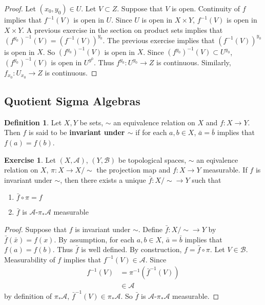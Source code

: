 \documentclass[12pt]{amsart}
\theoremstyle{definition}
\newtheorem{defn}[definition]{Definition}
\newtheorem{ex}[definition]{Exercise}
\newcommand{\MA}{\mathcal{A}}
\newcommand{\MB}{\mathcal{B}}
\newcommand{\lex}[1]{\label{ex:#1}}
\begin{document}
	\begin{proof}
		Let $(x_0, y_0) \in U$. Let $V \subset Z$. Suppose that $V$ is open. Continuity of $f$ implies that $f^{-1}(V)$ is open in $U$. Since $U$ is open in $X \times Y$, $f^{-1}(V)$ is open in $X \times Y$. A previous exercise in the section on product sets implies that $(f^{y_0})^{-1}(V) = (f^{-1}(V))^{y_0}$. The previous exercise implies that $(f^{-1}(V))^{y_0}$ is open in $X$. So $(f^{y_0})^{-1}(V)$ is open in $X$. Since $(f^{y_0})^{-1}(V) \subset U^{y_0}$, $(f^{y_0})^{-1}(V)$ is open in $U^{y^0}$. Thus $f^{y_0}: U^{y_0} \rightarrow Z$ is continuous. Similarly, $f_{x_0}: U_{x_0} \rightarrow Z$ is continuous.
	\end{proof}


	
	
	
	
	
	
	
	
	
	
	
	
	
	
	
	
	
	
	
	
	
	
	\newpage
	\subsection{Quotient Sigma Algebras}
	\begin{defn}
		Let $X,Y$ be sets, $\sim$ an equivalence relation on $X$ and $f: X \rightarrow Y$. Then $f$ is said to be \textbf{invariant under $\sim$} if for each $a,b \in X$, $\bar{a} = \bar{b}$ implies that $f(a) = f(b)$. 
	\end{defn}
	
	\begin{ex} \lex{34008}
		Let $(X, \MA)$, $(Y, \MB)$ be topological spaces, $\sim$ an eqivalence relation on $X$, $\pi:X \rightarrow X/\sim$ the projection map and $f:X \rightarrow Y$ measurable. If $f$ is invariant under $\sim$, then there exists a unique $\bar{f}:X / {\sim} \rightarrow Y$ such that 
		\begin{enumerate}
			\item $\bar{f} \circ \pi = f$
			\item $\bar{f}$ is $\MA$-$\pi_*\MA$ measurable 
		\end{enumerate}
	\end{ex}
	
	\begin{proof}
		Suppose that $f$ is invariant under $\sim$. Define $\bar{f}: X / {\sim} \rightarrow Y$ by $\bar{f}(\bar{x}) = f(x)$. By assumption, for each $a, b \in X$, $\bar{a} = \bar{b}$ implies that $f(a) = f(b)$. Thus $\bar{f}$ is well defined. By construction, $f = \bar{f} \circ \pi$. Let $V \in \MB$. Measurability of $f$ implies that $f^{-1}(V) \in \MA$. Since 
		\begin{align*}
			f^{-1}(V)
			&= \pi^{-1}(\bar{f}^{-1}(V)) \\
			& \in \MA
		\end{align*}
		by definition of $\pi_*\MA$, $\bar{f}^{-1}(V) \in \pi_*\MA$. So $\bar{f}$ is $\MA$-$\pi_*\MA$ measurable.
	\end{proof}
	
\end{document}
